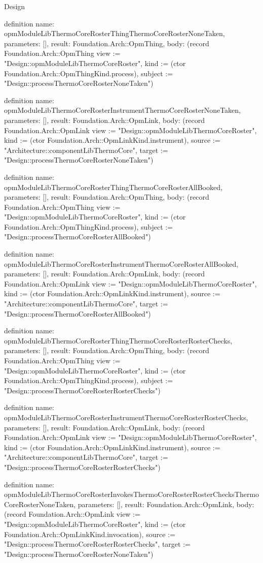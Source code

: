 \begin{lexlean}{Design}
\begin{semanticmodule}
definition{
  name: opmModuleLibThermoCoreRosterThingThermoCoreRosterNoneTaken,
  parameters: [],
  result: Foundation.Arch::OpmThing,
  body: (record Foundation.Arch::OpmThing {view := "Design::opmModuleLibThermoCoreRoster", kind := (ctor Foundation.Arch::OpmThingKind.process), subject := "Design::processThermoCoreRosterNoneTaken"})
}

definition{
  name: opmModuleLibThermoCoreRosterInstrumentThermoCoreRosterNoneTaken,
  parameters: [],
  result: Foundation.Arch::OpmLink,
  body: (record Foundation.Arch::OpmLink {view := "Design::opmModuleLibThermoCoreRoster", kind := (ctor Foundation.Arch::OpmLinkKind.instrument), source := "Architecture::componentLibThermoCore", target := "Design::processThermoCoreRosterNoneTaken"})
}

definition{
  name: opmModuleLibThermoCoreRosterThingThermoCoreRosterAllBooked,
  parameters: [],
  result: Foundation.Arch::OpmThing,
  body: (record Foundation.Arch::OpmThing {view := "Design::opmModuleLibThermoCoreRoster", kind := (ctor Foundation.Arch::OpmThingKind.process), subject := "Design::processThermoCoreRosterAllBooked"})
}

definition{
  name: opmModuleLibThermoCoreRosterInstrumentThermoCoreRosterAllBooked,
  parameters: [],
  result: Foundation.Arch::OpmLink,
  body: (record Foundation.Arch::OpmLink {view := "Design::opmModuleLibThermoCoreRoster", kind := (ctor Foundation.Arch::OpmLinkKind.instrument), source := "Architecture::componentLibThermoCore", target := "Design::processThermoCoreRosterAllBooked"})
}

definition{
  name: opmModuleLibThermoCoreRosterThingThermoCoreRosterRosterChecks,
  parameters: [],
  result: Foundation.Arch::OpmThing,
  body: (record Foundation.Arch::OpmThing {view := "Design::opmModuleLibThermoCoreRoster", kind := (ctor Foundation.Arch::OpmThingKind.process), subject := "Design::processThermoCoreRosterRosterChecks"})
}

definition{
  name: opmModuleLibThermoCoreRosterInstrumentThermoCoreRosterRosterChecks,
  parameters: [],
  result: Foundation.Arch::OpmLink,
  body: (record Foundation.Arch::OpmLink {view := "Design::opmModuleLibThermoCoreRoster", kind := (ctor Foundation.Arch::OpmLinkKind.instrument), source := "Architecture::componentLibThermoCore", target := "Design::processThermoCoreRosterRosterChecks"})
}

definition{
  name: opmModuleLibThermoCoreRosterInvokesThermoCoreRosterRosterChecksThermoCoreRosterNoneTaken,
  parameters: [],
  result: Foundation.Arch::OpmLink,
  body: (record Foundation.Arch::OpmLink {view := "Design::opmModuleLibThermoCoreRoster", kind := (ctor Foundation.Arch::OpmLinkKind.invocation), source := "Design::processThermoCoreRosterRosterChecks", target := "Design::processThermoCoreRosterNoneTaken"})
}


\end{semanticmodule}
\end{lexlean}
